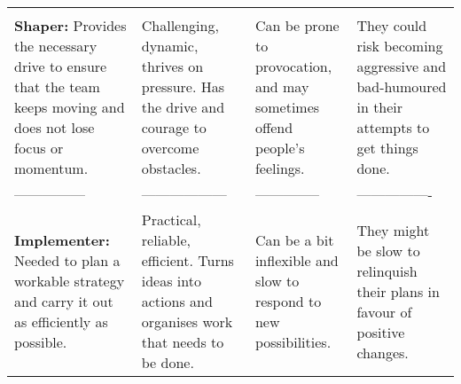 \documentclass[]{book}
\begin{document}
\begin{longtable}[]{@{}llll@{}}
\begin{minipage}[t]{0.22\columnwidth}
\end{minipage}\tabularnewline
\begin{minipage}[t]{0.21\columnwidth}\raggedright
\textbf{Shaper:} Provides the necessary drive to ensure that the team keeps moving and does not lose focus or momentum.\strut
\end{minipage} & \begin{minipage}[t]{0.25\columnwidth}\raggedright
Challenging, dynamic, thrives on pressure. Has the drive and courage to overcome obstacles.\strut
\end{minipage} & \begin{minipage}[t]{0.20\columnwidth}\raggedright
Can be prone to provocation, and may sometimes offend people's feelings.\strut
\end{minipage} & \begin{minipage}[t]{0.22\columnwidth}\raggedright
They could risk becoming aggressive and bad-humoured in their attempts to get things done.\strut
\end{minipage}\tabularnewline
\begin{minipage}[t]{0.21\columnwidth}\raggedright
---------------\strut
\end{minipage} & \begin{minipage}[t]{0.25\columnwidth}\raggedright
------------------\strut
\end{minipage} & \begin{minipage}[t]{0.20\columnwidth}\raggedright
--------------\strut
\end{minipage} & \begin{minipage}[t]{0.22\columnwidth}\raggedright
----------------\strut
\end{minipage}\tabularnewline
\begin{minipage}[t]{0.21\columnwidth}\raggedright
\textbf{Implementer:} Needed to plan a workable strategy and carry it out as efficiently as possible.\strut
\end{minipage} & \begin{minipage}[t]{0.25\columnwidth}\raggedright
Practical, reliable, efficient. Turns ideas into actions and organises work that needs to be done.\strut
\end{minipage} & \begin{minipage}[t]{0.20\columnwidth}\raggedright
Can be a bit inflexible and slow to respond to new possibilities.\strut
\end{minipage} & \begin{minipage}[t]{0.22\columnwidth}\raggedright
They might be slow to relinquish their plans in favour of positive changes.\strut

\end{minipage}
\end{longtable}
\end{document}
